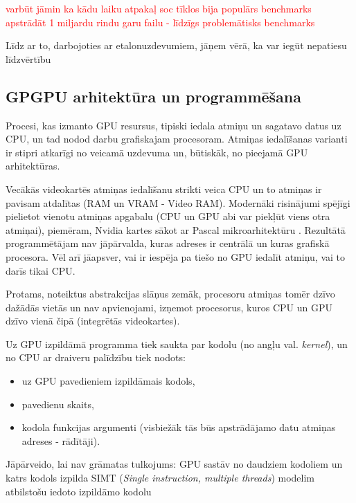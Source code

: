 \documentclass[12pt]{report}%
\theoremstyle{definition}
\begin{document}
\textcolor{red}{varbūt jāmin ka kādu laiku atpakaļ soc tīklos bija populārs benchmarks apstrādāt 1 miljardu rindu garu failu - līdzīgs problemātisks benchmarks}

Līdz ar to, darbojoties ar etalonuzdevumiem, jāņem vērā, ka var iegūt nepatiesu līdzvērtību

\begin{center}
\chapter{GPGPU arhitektūra un programmēšana}
\end{center}

Procesi, kas izmanto GPU resursus, tipiski iedala atmiņu un sagatavo datus uz CPU, un tad nodod darbu
grafiskajam procesoram. Atmiņas iedalīšanas varianti ir stipri atkarīgi no veicamā uzdevuma un, būtiskāk, no
pieejamā GPU arhitektūras.

Vecākās videokartēs atmiņas iedalīšanu strikti veica CPU un to atmiņas ir pavisam atdalītas 
(RAM un VRAM - Video RAM). Modernāki risinājumi spējīgi pielietot vienotu
atmiņas apgabalu (CPU un GPU abi var piekļūt viens otra atmiņai), piemēram, Nvidia kartes sākot ar Pascal
mikroarhitektūru \cite{nvidia_tesla_p100}. Rezultātā programmētājam nav jāpārvalda,
kuras adreses ir centrālā un kuras grafiskā procesora. Vēl arī jāapsver, vai ir iespēja pa tiešo no GPU
iedalīt atmiņu, vai to darīs tikai CPU.

Protams, noteiktus abstrakcijas slāņus zemāk, procesoru atmiņas tomēr dzīvo dažādās vietās un nav apvienojami,
izņemot procesorus, kuros CPU un GPU dzīvo vienā čipā (integrētās videokartes).

Uz GPU izpildāmā programma tiek saukta par kodolu (no angļu val. \textit{kernel}), un no CPU ar draiveru
palīdzību tiek nodots:
\begin{itemize}
    \item uz GPU pavedieniem izpildāmais kodols,
    \item pavedienu skaits,
    \item kodola funkcijas argumenti (visbiežāk tās būs apstrādājamo datu atmiņas adreses - rādītāji).
\end{itemize}

Jāpārveido, lai nav grāmatas tulkojums:    GPU sastāv no daudziem kodoliem un katrs kodols izpilda
SIMT (\textit{Single instruction, multiple threads}) modelim atbilstošu iedoto izpildāmo kodolu
\end{document}
